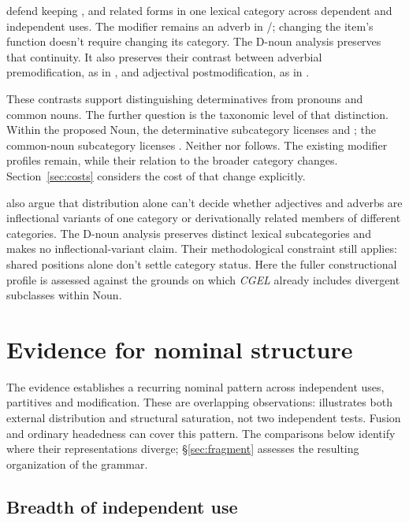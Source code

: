 \documentclass[12pt]{article}
\begin{document}
\textcite[40--42]{payne2010} defend keeping ,  and related forms in one lexical category across dependent and independent uses. The modifier remains an adverb in /; changing the item's function doesn't require changing its category. The D-noun analysis preserves that continuity. It also preserves their contrast between adverbial premodification, as in , and adjectival postmodification, as in .

These contrasts support distinguishing determinatives from pronouns and common nouns. The further question is the taxonomic level of that distinction. Within the proposed Noun, the determinative subcategory licenses  and ; the common-noun subcategory licenses . Neither  nor  follows. The existing modifier profiles remain, while their relation to the broader category changes. Section~\ref{sec:costs} considers the cost of that change explicitly.

\textcite[60--61]{payne2010} also argue that distribution alone can't decide whether adjectives and adverbs are inflectional variants of one category or derivationally related members of different categories. The D-noun analysis preserves distinct lexical subcategories and makes no inflectional-variant claim. Their methodological constraint still applies: shared positions alone don't settle category status. Here the fuller constructional profile is assessed against the grounds on which \textit{CGEL} already includes divergent subclasses within Noun.

\section{Evidence for nominal structure}\label{sec:evidence}

The evidence establishes a recurring nominal pattern across independent uses, partitives and modification. These are overlapping observations:  illustrates both external distribution and structural saturation, not two independent tests. Fusion and ordinary headedness can cover this pattern. The comparisons below identify where their representations diverge; §\ref{sec:fragment} assesses the resulting organization of the grammar.

\subsection{Breadth of independent use}
\end{document}
